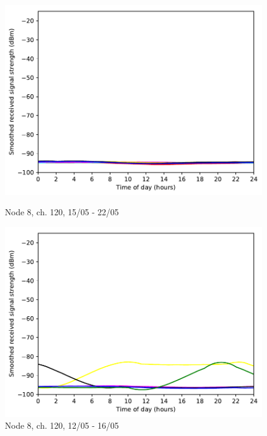 \documentclass[a4paper, 11pt]{article}
\begin{document}
\begin{figure}[!h]
\begin{minipage}{0.47\textwidth}
	\centering
	\includegraphics[width=\textwidth]{images/5_GHz/cot-node3-student_2017-05-22_chan100_image.pdf}
	\caption{Node 8, ch. 120, 15/05 - 22/05}
	\label{node3_5ghz_traffic_chan100}
\end{minipage}\hfill
\begin{minipage}{0.47\textwidth}
	\centering
	\includegraphics[width=\textwidth]{images/5_GHz/cot-node8-student_2017-05-16_chan120_image.pdf}
	\caption{Node 8, ch. 120, 12/05 - 16/05}
	\label{node8_5ghz_traffic_chan120}
\end{minipage}\hfill
\end{figure}
\end{document}
